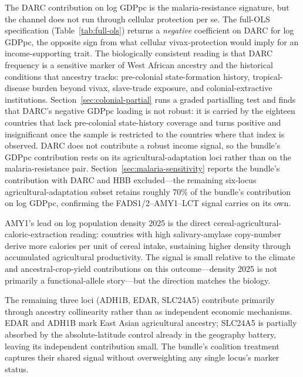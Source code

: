 \documentclass[11pt,letterpaper]{article}
\begin{document}
The DARC contribution on log GDPpc is the malaria-resistance signature, but the channel does not run through cellular protection per se. The full-OLS specification (Table~\ref{tab:full-ols}) returns a \emph{negative} coefficient on DARC for log GDPpc, the opposite sign from what cellular vivax-protection would imply for an income-supporting trait. The biologically consistent reading is that DARC frequency is a sensitive marker of West African ancestry and the historical conditions that ancestry tracks: pre-colonial state-formation history, tropical-disease burden beyond vivax, slave-trade exposure, and colonial-extractive institutions. Section~\ref{sec:colonial-partial} runs a graded partialling test and finds that DARC's negative GDPpc loading is not robust: it is carried by the eighteen countries that lack pre-colonial state-history coverage and turns positive and insignificant once the sample is restricted to the countries where that index is observed. DARC does not contribute a robust income signal, so the bundle's GDPpc contribution rests on its agricultural-adaptation loci rather than on the malaria-resistance pair. Section~\ref{sec:malaria-sensitivity} reports the bundle's contribution with DARC and HBB excluded---the remaining six-locus agricultural-adaptation subset retains roughly 70\% of the bundle's contribution on log GDPpc, confirming the FADS1/2--AMY1--LCT signal carries on its own.

AMY1's lead on log population density 2025 is the direct cereal-agricultural-caloric-extraction reading: countries with high salivary-amylase copy-number derive more calories per unit of cereal intake, sustaining higher density through accumulated agricultural productivity. The signal is small relative to the climate and ancestral-crop-yield contributions on this outcome---density 2025 is not primarily a functional-allele story---but the direction matches the biology.

The remaining three loci (ADH1B, EDAR, SLC24A5) contribute primarily through ancestry collinearity rather than as independent economic mechanisms. EDAR and ADH1B mark East Asian agricultural ancestry; SLC24A5 is partially absorbed by the absolute-latitude control already in the geography battery, leaving its independent contribution small. The bundle's coalition treatment captures their shared signal without overweighting any single locus's marker status.

\begin{table}[H]
\centering
\caption{Within-functional-bundle Shapley R\textsuperscript{2} decomposition. Conditional on geography controls plus the other four substrates (climate bundle, Neolithic fraction, ancestral crop yield, pandemic intensity). Column sums give the per-locus partition of the bundle's variance contribution on each outcome; they approximate the functional bundle's Shapley R\textsuperscript{2} from Table~\ref{tab:shapley} (e.g.\ 0.166 vs 0.175 on log GDPpc) but differ because the within-bundle decomposition uses a different residual baseline.}
\label{tab:functional-subshapley}
\small

\end{table}
\end{document}
